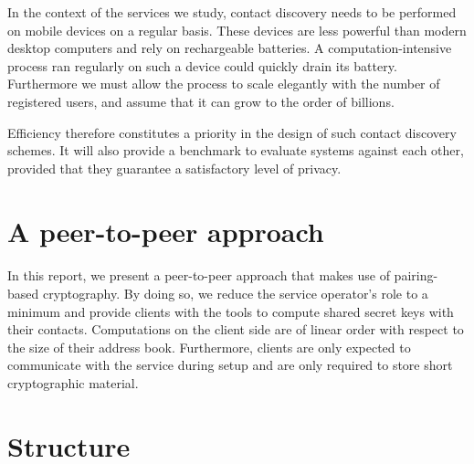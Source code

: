 In the context of the services we study, contact discovery needs to be performed on mobile devices on a regular basis. These devices are less powerful than modern desktop computers and rely on rechargeable batteries. A computation-intensive process ran regularly on such a device could quickly drain its battery. Furthermore we must allow the process to scale elegantly with the number of registered users, and assume that it can grow to the order of billions.

Efficiency therefore constitutes a priority in the design of such contact discovery schemes. It will also provide a benchmark to evaluate systems against each other, provided that they guarantee a satisfactory level of privacy.




%


\section{A peer-to-peer approach}

\paragraph{} In this report, we present a peer-to-peer approach that makes use of pairing-based cryptography. By doing so, we reduce the service operator's role to a minimum and provide clients with the tools to compute shared secret keys with their contacts. Computations on the client side are of linear order with respect to the size of their address book. Furthermore, clients are only expected to communicate with the service during setup and are only required to store short cryptographic material.



\section{Structure}




























